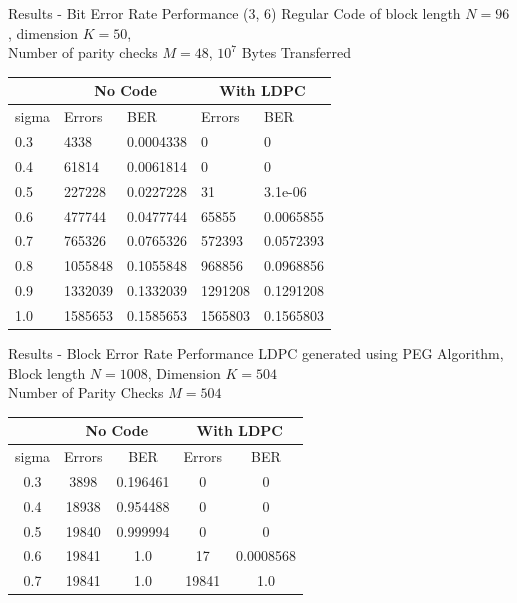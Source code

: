 \documentclass{beamer}
\begin{document}
     \begin{frame}{Results - Bit Error Rate Performance}
  (3, 6) Regular Code of block length $N = 96$, dimension $K = 50$, \\
  Number of parity checks $M = 48$,  $10^7$ Bytes Transferred
\begin{center}
 \begin{tabular}{| l | l | l | l | l |}
 \hline
 {}	&  \multicolumn{2}{c|}{No Code} 	&  \multicolumn{2}{c|}{With LDPC}		\\ \hline
  sigma & Errors		& BER		& Errors		& BER		 	\\ \hline
  0.3  	& 4338			& 0.0004338	& 0			& 0			\\ \hline
  0.4	& 61814			& 0.0061814	& 0			& 0			\\ \hline
  0.5	& 227228		& 0.0227228	& 31			& 3.1e-06		\\ \hline
  0.6	& 477744		& 0.0477744	& 65855			& 0.0065855		\\ \hline
  0.7	& 765326		& 0.0765326	& 572393		& 0.0572393		\\ \hline
  0.8	& 1055848		& 0.1055848	& 968856		& 0.0968856		\\ \hline
  0.9	& 1332039		& 0.1332039	& 1291208		& 0.1291208		\\ \hline
  1.0	& 1585653		& 0.1585653	& 1565803		& 0.1565803		\\ \hline
 \end{tabular}
\end{center}
\end{frame}

\begin{frame} {Results - Block Error Rate Performance}
LDPC generated using PEG Algorithm, \\ 
Block length $N = 1008$, Dimension $K = 504$ \\
Number of Parity Checks $M = 504$
\begin{center}
 \begin{tabular}{| c | c | c | c | c |}
 \hline
 {}	&  \multicolumn{2}{c|}{No Code} 	&  \multicolumn{2}{c|}{With LDPC}		\\ \hline
  sigma & Errors		& BER		& Errors		& BER		 	\\ \hline
  0.3  	& 3898			& 0.196461	& 0			& 0			\\ \hline
  0.4	& 18938			& 0.954488	& 0			& 0			\\ \hline
  0.5	& 19840			& 0.999994	& 0			& 0			\\ \hline
  0.6	& 19841			& 1.0		& 17			& 0.0008568		\\ \hline
  0.7	& 19841			& 1.0		& 19841			& 1.0			\\ \hline
 \end{tabular}
\end{center}
\end{frame}
\end{document}
